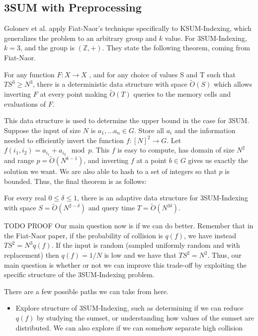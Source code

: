 \documentclass[12pt]{article}
\newenvironment{theorem}[2][Theorem]{\begin{trivlist}
\item[\hskip \labelsep {\bfseries #1}\hskip \labelsep {\bfseries #2.}]}{\end{trivlist}}
\begin{document}
\subsection*{3SUM with Preprocessing}
Golonev et al. apply Fiat-Naor's technique specifically to KSUM-Indexing, which generalizes the problem to an arbitrary group and $k$ value. For 3SUM-Indexing, $k=3$, and the group is $(\mathbb{Z}, +)$. They state the following theorem, coming from Fiat-Naor.
\begin{theorem}{: Fiat-Naor}
For any function $F : X \rightarrow X$ , and for any choice of values S and T such that $TS^3 \geq N^3$, there is a deterministic data structure with space $\tilde{O}(S)$ which allows inverting $F$ at every point making $\tilde{O}(T)$ queries to the memory cells and evaluations of $F$.
\end{theorem}
This data structure is used to determine the upper bound in the case for 3SUM. Suppose the input of size $N$ is $a_1,...a_n \in G$. Store all $a_i$ and the information needed to efficiently invert the function $f: [N]^{2} \rightarrow G$. Let $f(i_1,i_2) = a_{i_1} + a_{i_2} \mod p$. This $f$ is easy to compute, has domain of size $N^{2}$ and range $p = \tilde{O}(N^{k-1})$, and inverting $f$ at a point $b\in G$ gives us exactly the solution we want. We are also able to hash to a set of integers so that $p$ is bounded. Thus, the final theorem is as follows:
\begin{theorem}{: Golonev et al.}
For every real $0 \leq \delta \leq 1$, there is an adaptive data structure for 3SUM-Indexing with space $S = \tilde{O}(N^{2 - \delta})$ and query time $T = \tilde{O}(N^{3\delta})$.
\end{theorem}
TODO PROOF
Our main question now is if we can do better. Remember that in the Fiat-Naor paper, if the probability of collision is $q(f)$, we have instead $TS^2 = N^3q(f)$. If the input is random (sampled uniformly random and with replacement) then $q(f) = 1/N$ is low and we have that $TS^2 = N^2$. Thus, our main question is whether or not we can improve this trade-off by exploiting the specific structure of the 3SUM-Indexing problem.

There are a few possible paths we can take from here.
\begin{itemize}
    \item Explore structure of 3SUM-Indexing, such as determining if we can reduce $q(f)$ by studying the sumset, or understanding how values of the sumset are distributed. We can also explore if we can somehow separate high collision

\end{itemize}
\end{document}
